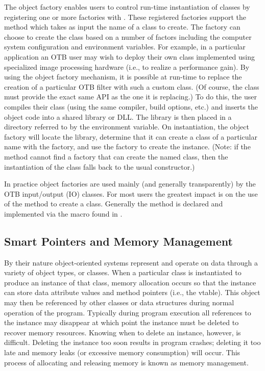 The object factory enables users to control run-time instantiation of classes
by registering one or more factories with . These
registered factories support the method 
which takes as input the name of a class to create. The factory can choose to
create the class based on a number of factors including the computer system
configuration and environment variables. For example, in a particular
application an OTB user may wish to deploy their own class implemented using
specialized image processing hardware (i.e., to realize a performance
gain). By using the object factory mechanism, it is possible at run-time to
replace the creation of a particular OTB filter with such a custom class. (Of
course, the class must provide the exact same API as the one it is
replacing.) To do this, the user compiles their class (using the same compiler,
build options, etc.) and inserts the object code into a shared library or
DLL. The library is then placed in a directory referred to by the
 environment variable. On instantiation, the object
factory will locate the library, determine that it can create a class of a
particular name with the factory, and use the factory to create the
instance. (Note: if the  method cannot find a factory
that can create the named class, then the instantiation of the class falls
back to the usual constructor.)

In practice object factories are used mainly (and generally transparently) by
the OTB input/output (IO) classes. For most users the greatest impact is on
the use of the  method to create a class. Generally the
 method is declared and implemented via the macro
 found in .


\subsection{Smart Pointers and Memory Management}
\label{sec:SmartPointers}


By their nature object-oriented systems represent and operate on data through
a variety of object types, or classes. When a particular class is
instantiated to produce an instance of that class, memory allocation occurs
so that the instance can store data attribute values and method pointers
(i.e., the vtable). This object may then be referenced by other classes or
data structures during normal operation of the program. Typically during
program execution all references to the instance may disappear at which point
the instance must be deleted to recover memory resources. Knowing when to
delete an instance, however, is difficult. Deleting the instance too soon
results in program crashes; deleting it too late and memory leaks (or
excessive memory consumption) will occur. This process of allocating and
releasing memory is known as memory management.

